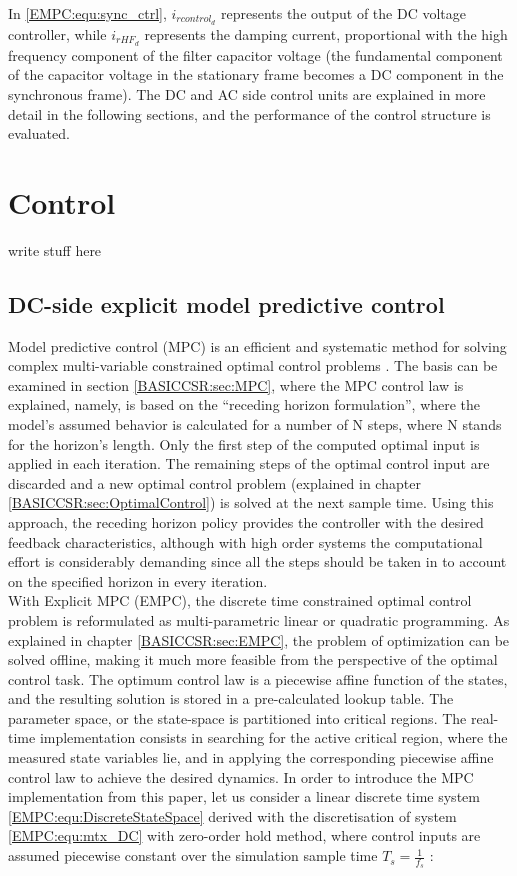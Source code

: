     In \ref{EMPC:equ:sync_ctrl}, $i_{rcontrol_d}$ represents the output of the DC voltage controller, while $i_{rHF_d}$ represents the damping current, proportional with the high frequency component of the filter capacitor voltage (the fundamental component of the capacitor voltage in the stationary frame becomes a DC component in the synchronous frame). The DC and AC side control units are explained in more detail in the following sections, and the performance of the control structure is evaluated.
		
\section{Control}\label{EMPC:sec:Control}

write stuff here

\subsection{DC-side explicit model predictive control} \label{EMPC:sec:DCside}

    Model predictive control (MPC) is an efficient and systematic method for solving complex multi-variable constrained optimal control problems \cite{vajda2017limiting}. The basis can be examined in section \ref{BASICCSR:sec:MPC}, where the MPC control law is explained, namely, is based on the “receding horizon formulation”, where the model’s assumed behavior is calculated for a number of N steps, where N stands for the horizon’s length. Only the first step of the computed optimal input is applied in each iteration. The remaining steps of the optimal control input are discarded and a new optimal control problem (explained in chapter \ref{BASICCSR:sec:OptimalControl}) is solved at the next sample time. Using this approach, the receding horizon policy provides the controller with the desired feedback characteristics, although with high order systems the computational effort is considerably demanding since all the steps should be taken in to account on the specified horizon in every iteration.\\
		With Explicit MPC (EMPC), the discrete time constrained optimal control problem is reformulated as multi-parametric linear or quadratic programming. As explained in chapter \ref{BASICCSR:sec:EMPC}, the problem of optimization can be solved offline, making it much more feasible from the perspective of the optimal control task. The optimum control law is a piecewise affine function of the states, and the resulting solution is stored in a pre-calculated lookup table. The parameter space, or the state-space is partitioned into critical regions. The real-time implementation consists in searching for the active critical region, where the measured state variables lie, and in applying the corresponding piecewise affine control law to achieve the desired dynamics.
    In order to introduce the MPC implementation from this paper, let us consider a linear discrete time system \ref{EMPC:equ:DiscreteStateSpace} derived with the discretisation of system \ref{EMPC:equ:mtx_DC} with zero-order hold method, where control inputs are assumed piecewise constant over the simulation sample time $T_s=\frac{1}{f_s}$ :

